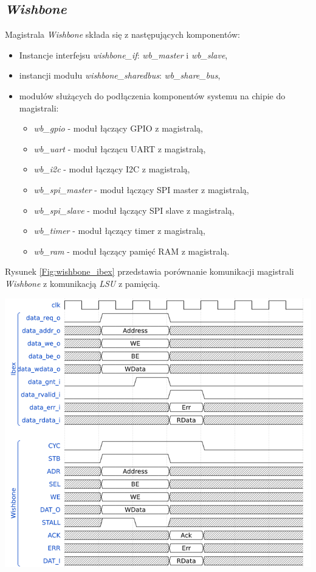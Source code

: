 \documentclass[11pt,a4paper]{article}
\begin{document}
	\subsection{\textit{Wishbone}}
	\hspace{5mm}
Magistrala \textit{Wishbone} składa się z następujących komponentów:
\begin{itemize}
\item Instancje interfejsu \textit{wishbone\_if}: \textit{wb\_master} i \textit{wb\_slave},
\item instancji modułu \textit{wishbone\_sharedbus}: \textit{wb\_share\_bus},
\item modułów służących do podłączenia komponentów systemu na chipie do magistrali:
	\begin{itemize}
		\item \textit{wb\_gpio} - moduł łączący GPIO z magistralą,
		\item \textit{wb\_uart} - moduł łączącu UART z magistralą,
		\item \textit{wb\_i2c} - moduł łączący I2C z magistralą,
		\item \textit{wb\_spi\_master} - moduł łączący SPI master z magistralą,
		\item \textit{wb\_spi\_slave} - moduł łączący SPI slave z magistralą,
		\item \textit{wb\_timer} - moduł łączący timer z magistralą,
		\item \textit{wb\_ram} - moduł łączący pamięć RAM z magistralą.
	\end{itemize}
\end{itemize}
Rysunek \ref{Fig:wishbone_ibex} przedstawia porównanie komunikacji magistrali \textit{Wishbone} z komunikacją \textit{LSU} z pamięcią.

			\begin{minipage}{\textwidth}

					\includegraphics[width=14cm]{./rysunki/timing.png}
			\end{minipage} 
\end{document}

